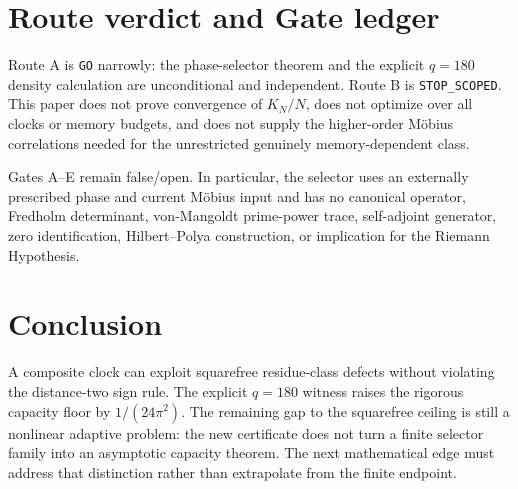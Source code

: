 \documentclass[11pt]{article}
\theoremstyle{definition}
\theoremstyle{remark}
\begin{document}
\section{Route verdict and Gate ledger}

Route A is \texttt{GO} narrowly: the phase-selector theorem and the explicit
$q=180$ density calculation are unconditional and independent.  Route B is
\texttt{STOP\_SCOPED}.  This paper does not prove convergence of $K_N/N$, does
not optimize over all clocks or memory budgets, and does not supply the
higher-order M\"obius correlations needed for the unrestricted genuinely
memory-dependent class.

Gates A--E remain false/open.  In particular, the selector uses an externally
prescribed phase and current M\"obius input and has no canonical operator,
Fredholm determinant,
von-Mangoldt prime-power trace, self-adjoint generator, zero identification,
Hilbert--Polya construction, or implication for the Riemann Hypothesis.

\section{Conclusion}

A composite clock can exploit squarefree residue-class defects without
violating the distance-two sign rule.  The explicit $q=180$ witness raises the
rigorous capacity floor by $1/(24\pi^2)$.  The remaining gap to the squarefree
ceiling is still a nonlinear adaptive problem: the new certificate does not
turn a finite selector family into an asymptotic capacity theorem.  The next
mathematical edge must address that distinction rather than extrapolate from
the finite endpoint.



\end{document}
